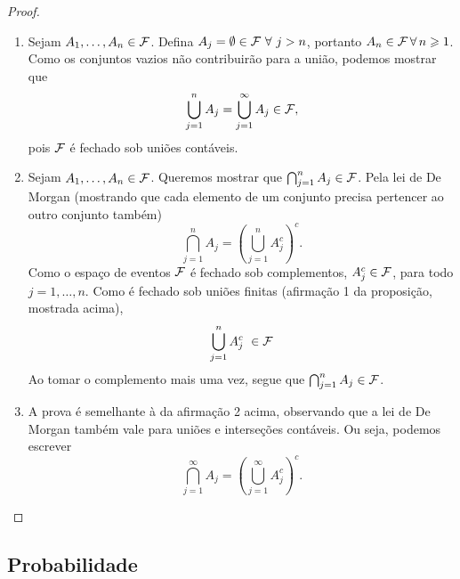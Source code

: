\begin{proof}
~
\begin{enumerate}
\item Sejam $A_1, \dots, A_n \in \mathcal F$. Defina $A_j = \emptyset\in\mathcal F \,\, \forall \,\, j>n$, portanto $A_n \in \mathcal F \, \forall \, n\geqslant 1$. Como os conjuntos vazios não contribuirão para a união, podemos mostrar que
\[
\bigcup_{j=1}^{n} A_j = \bigcup_{j=1}^\infty A_j\in\mathcal F,
\]
pois $\mathcal F$ é fechado sob uniões contáveis.
\item Sejam $A_1, \dots, A_n \in \mathcal F$. Queremos mostrar que $\bigcap_{j=1}^{n}A_j \in \mathcal F$. Pela lei de De Morgan (mostrando que cada elemento de um conjunto precisa pertencer ao outro conjunto também)
\[
\bigcap_{j=1}^{n}A_j = \left(\bigcup_{j=1}^{n}A_j^c\right)^c.
\]
Como o espaço de eventos $\mathcal F$ é fechado sob complementos, $A_j^c\in \mathcal F$, para todo $j=1,\dots,n$. Como é fechado sob uniões finitas (afirmação 1 da proposição, mostrada acima),
\[
\bigcup_{j=1}^{n}A_j^c \ \in \mathcal F
\]
Ao tomar o complemento mais uma vez, segue que $\bigcap_{j=1}^{n}A_j\in\mathcal F$.
\item A prova é semelhante à da afirmação 2 acima, observando que a lei de De Morgan também vale para uniões e interseções contáveis. Ou seja, podemos escrever
\[
\bigcap_{j=1}^{\infty}A_j = \left(\bigcup_{j=1}^{\infty}A_j^c\right)^c.
\]
\end{enumerate}
\end{proof}

\subsection{Probabilidade}

